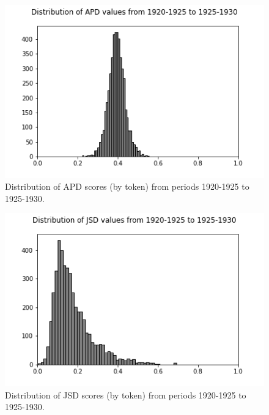 \documentclass[10pt, a4paper]{article}
\begin{document}
\begin{figure}[!h]
\begin{center}
\includegraphics[scale=0.5]{code/distribution_imgs/1920_APD.png}
\caption{Distribution of APD scores (by token) from periods 1920-1925 to 1925-1930.}
\label{1920_APD}
\end{center}
\end{figure}

\begin{figure}[!h]
\begin{center}
\includegraphics[scale=0.5]{code/distribution_imgs/1920_JSD.png}
\caption{Distribution of JSD scores (by token) from periods 1920-1925 to 1925-1930.}
\label{1920_JSD}
\end{center}
\end{figure}
\end{document}
